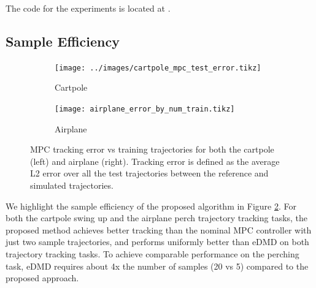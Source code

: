 \documentclass{article}
\begin{document}
The code for the experiments is located at .  


\subsection{Sample Efficiency}
\begin{figure}[t]
  \centering
  \begin{subfigure}[t]{0.48\textwidth}
    \texttt{[image: ../images/cartpole\_mpc\_test\_error.tikz]}
    \caption{Cartpole}
    \label{fig:cartpole_mpc_test_error}
  \end{subfigure}
  \hfill
  \begin{subfigure}[t]{0.48\textwidth}
    \texttt{[image: airplane\_error\_by\_num\_train.tikz]}
    \caption{Airplane}
  \end{subfigure}
  \caption{MPC tracking error vs training trajectories for both the cartpole (left) and
  airplane (right). Tracking error is defined as the average L2 error over all the
  test trajectories between the reference and simulated trajectories.}
  \label{fig:sample_efficiency}
\end{figure}

We highlight the sample efficiency of the proposed algorithm in Figure 
\ref{fig:sample_efficiency}. For both the cartpole swing up and the airplane perch trajectory 
tracking tasks, the proposed method achieves better tracking than the nominal MPC controller
with just two sample trajectories, and performs uniformly better than eDMD on both 
trajectory tracking tasks. To achieve comparable performance on the perching task, eDMD 
requires about 4x the number of samples (20 vs 5) compared to the proposed approach.


\end{document}
